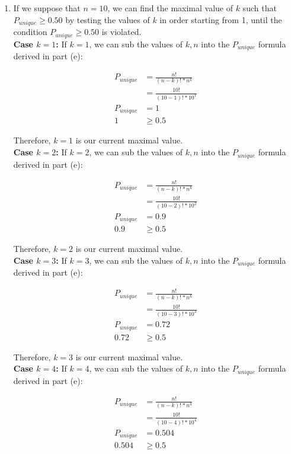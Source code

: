 \documentclass[11pt]{article}
\theoremstyle{definition}
\begin{document}
\begin{enumerate}
\begin{enumerate}
\item If we suppose that $n = 10$, we can find the maximal value of $k$ such that $P_{unique} \geq 0.50$ by testing the values of $k$ in order starting from 1, until 
the condition $P_{unique} \geq 0.50$ is violated.\\

\textbf{Case $k = 1$:} If $k = 1$, we can sub the values of $k, n$ into the $P_{unique}$ formula derived in part (e):

\begin{align*}
P_{unique} &= \frac{n!}{(n - k)! * n^k}\\
&= \frac{10!}{(10 - 1)! * 10^1}\\
P_{unique} &= 1\\
1 &\geq 0.5
\end{align*}

Therefore, $k = 1$ is our current maximal value.\\

\textbf{Case $k = 2$:} If $k = 2$, we can sub the values of $k, n$ into the $P_{unique}$ formula derived in part (e):

\begin{align*}
P_{unique} &= \frac{n!}{(n - k)! * n^k}\\
&= \frac{10!}{(10 - 2)! * 10^2}\\
P_{unique} &= 0.9\\
0.9 &\geq 0.5
\end{align*}

Therefore, $k = 2$ is our current maximal value.\\

\textbf{Case $k = 3$:} If $k = 3$, we can sub the values of $k, n$ into the $P_{unique}$ formula derived in part (e):

\begin{align*}
P_{unique} &= \frac{n!}{(n - k)! * n^k}\\
&= \frac{10!}{(10 - 3)! * 10^3}\\
P_{unique} &= 0.72\\
0.72 &\geq 0.5
\end{align*}

Therefore, $k = 3$ is our current maximal value.\\

\textbf{Case $k = 4$:} If $k = 4$, we can sub the values of $k, n$ into the $P_{unique}$ formula derived in part (e):

\begin{align*}
P_{unique} &= \frac{n!}{(n - k)! * n^k}\\
&= \frac{10!}{(10 - 4)! * 10^4}\\
P_{unique} &= 0.504\\
0.504 &\geq 0.5
\end{align*}


\end{enumerate}
\end{enumerate}
\end{document}

